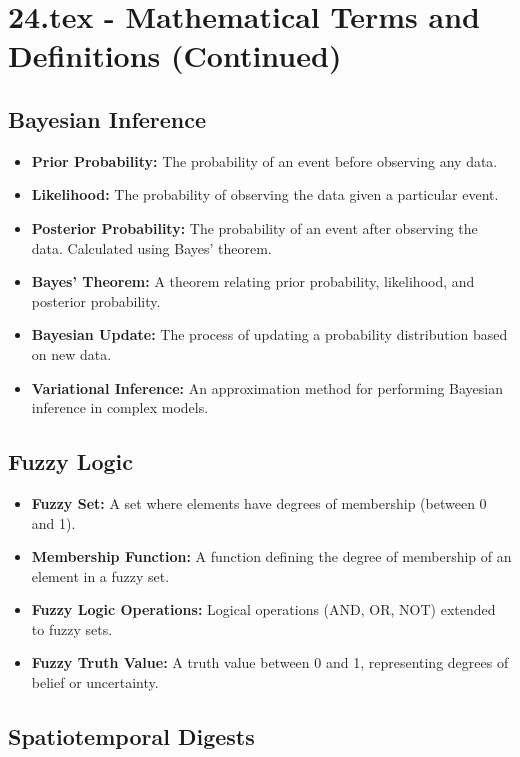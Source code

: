 \documentclass[12pt, a4paper]{article}
\begin{document}
 
\section{24.tex - Mathematical Terms and Definitions (Continued)}

\subsection{Bayesian Inference}

\begin{itemize}
    \item \textbf{Prior Probability:} The probability of an event before observing any data.
    \item \textbf{Likelihood:} The probability of observing the data given a particular event.
    \item \textbf{Posterior Probability:} The probability of an event after observing the data.  Calculated using Bayes' theorem.
    \item \textbf{Bayes' Theorem:} A theorem relating prior probability, likelihood, and posterior probability.
    \item \textbf{Bayesian Update:} The process of updating a probability distribution based on new data.
    \item \textbf{Variational Inference:} An approximation method for performing Bayesian inference in complex models.
\end{itemize}

\subsection{Fuzzy Logic}

\begin{itemize}
    \item \textbf{Fuzzy Set:} A set where elements have degrees of membership (between 0 and 1).
    \item \textbf{Membership Function:} A function defining the degree of membership of an element in a fuzzy set.
    \item \textbf{Fuzzy Logic Operations:}  Logical operations (AND, OR, NOT) extended to fuzzy sets.
    \item \textbf{Fuzzy Truth Value:} A truth value between 0 and 1, representing degrees of belief or uncertainty.
\end{itemize}


\subsection{Spatiotemporal Digests}
\end{document}

